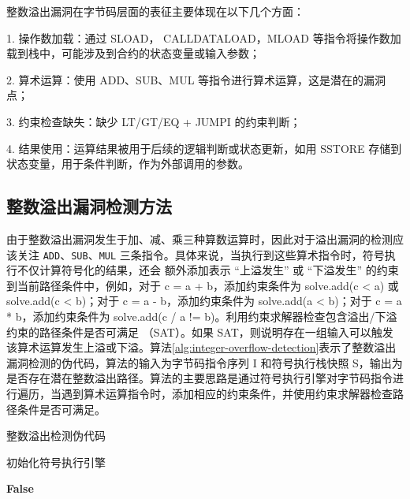 \documentclass[print, master, vlined, timesmath]{DissertUESTC}
\begin{document}
整数溢出漏洞在字节码层面的表征主要体现在以下几个方面：

1. 操作数加载：通过 SLOAD， CALLDATALOAD，MLOAD 等指令将操作数加载到栈中，可能涉及到合约的状态变量或输入参数；

2. 算术运算：使用 ADD、SUB、MUL 等指令进行算术运算，这是潜在的漏洞点；

3. 约束检查缺失：缺少 LT/GT/EQ + JUMPI 的约束判断；

4. 结果使用：运算结果被用于后续的逻辑判断或状态更新，如用 SSTORE 存储到状态变量，用于条件判断，作为外部调用的参数。


\subsection{整数溢出漏洞检测方法}

由于整数溢出漏洞发生于加、减、乘三种算数运算时，因此对于溢出漏洞的检测应该关注 \texttt{ADD}、\texttt{SUB}、\texttt{MUL} 三条指令。具体来说，当执行到这些算术指令时，符号执行不仅计算符号化的结果，还会
额外添加表示 “上溢发生” 或 “下溢发生” 的约束到当前路径条件中，例如，对于 c = a + b，添加约束条件为 solve.add(c < a) 或 solve.add(c < b)；对于 c = a - b，添加约束条件为 solve.add(a < b)；对于 c = a * b，添加约束条件为 solve.add(c / a != b)。利用约束求解器检查包含溢出/下溢约束的路径条件是否可满足
（SAT）。如果 SAT，则说明存在一组输入可以触发该算术运算发生上溢或下溢。算法\ref{alg:integer-overflow-detection}表示了整数溢出漏洞检测的伪代码，算法的输入为字节码指令序列 I 和符号执行栈快照 S，输出为是否存在潜在整数溢出路径。算法的主要思路是通过符号执行引擎对字节码指令进行遍历，当遇到算术运算指令时，添加相应的约束条件，并使用约束求解器检查路径条件是否可满足。




\begin{algorithm}
    \caption{整数溢出检测伪代码}
    
    初始化符号执行引擎\;
    
    
    \Return \textbf{False}
    \label{alg:integer-overflow-detection}
    \end{algorithm}
   
\end{document}
